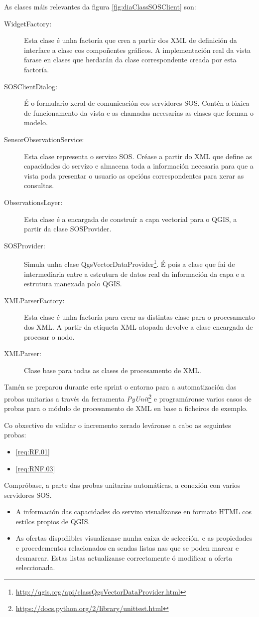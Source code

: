 As clases máis relevantes da figura \ref{fig:diaClassSOSClient} son:
\begin{description}
\item[WidgetFactory:] Esta clase é unha factoría que crea a partir dos XML de definición da interface a clase cos compoñentes gráficos. A implementación real da vista farase en clases que herdarán da clase correspondente creada por esta factoría.
\item[SOSClientDialog:] É o formulario xeral de comunicación cos servidores SOS. Contén a lóxica de funcionamento da vista e as chamadas necesarias as clases que forman o modelo.
\item[SensorObservationService:] Esta clase representa o servizo SOS. Créase a partir do XML que define as capacidades do servizo e almacena toda a información necesaria para que a vista poda presentar o usuario as opcións correspondentes para xerar as consultas.
\item[ObservationsLayer:] Esta clase é a encargada de construír a capa vectorial para o QGIS, a partir da clase SOSProvider.
\item[SOSProvider:] Simula unha clase QgsVectorDataProvider\footnote{\url{http://qgis.org/api/classQgsVectorDataProvider.html}}. É pois a clase que fai de intermediaria entre a estrutura de datos real da información da capa e a estrutura manexada polo QGIS.
\item[XMLParserFactory:] Esta clase é unha factoría para crear as distintas clase para o procesamento dos XML. A partir da etiqueta XML atopada devolve a clase encargada de procesar o nodo.
\item[XMLParser:] Clase base para todas as clases de procesamento de XML.
\end{description}

Tamén se preparou durante este sprint o entorno para a automatización das probas unitarias a través da ferramenta \emph{PyUnit}\footnote{\url{https://docs.python.org/2/library/unittest.html}} e programáronse varios casos de probas para o módulo de procesamento de XML en base a ficheiros de exemplo.

Co obxectivo de validar o incremento xerado leváronse a cabo as seguintes probas:

		  {\begin{itemize}\item \ref{req:RF.01} \item \ref{req:RNF.03}\end{itemize}} %
		  {Compróbase, a parte das probas unitarias automáticas, a conexión con varios servidores SOS.} %
		  {\begin{itemize}
		  \item A información das capacidades do servizo visualízanse en formato HTML cos estilos propios de QGIS.
		  \item As ofertas dispoñibles visualízanse nunha caixa de selección, e as propiedades e procedementos relacionados en sendas listas nas que se poden marcar e desmarcar. Estas listas actualízanse correctamente ó modificar a oferta seleccionada.
		  \end{itemize}} %
		  
